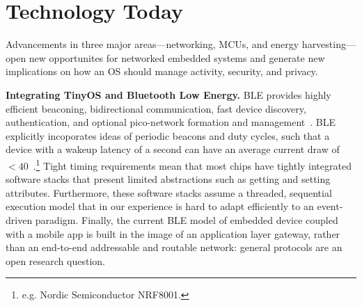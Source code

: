 \section{Technology Today}
Advancements in three major areas---networking, MCUs, and energy
harvesting---open new opportunites for networked embedded systems and generate
new implications on how an OS should manage activity, security, and privacy.


\smallskip\noindent
\textbf{Integrating TinyOS and Bluetooth Low Energy.}
BLE provides highly efficient beaconing,
bidirectional communication, fast device discovery, authentication, and
optional pico-network formation and management~\cite{ble-overview}.
BLE explicitly incoporates ideas of periodic beacons and duty cycles,
such that a device with a wakeup latency of a second can have
an average current draw of $< 40$~\uA.\footnote{
  e.g. Nordic Semiconductor NRF8001.
}
%
Tight timing requirements mean that most chips have tightly
integrated software stacks that present limited abstractions such as
getting and setting attributes. Furthermore, these software stacks
assume a threaded, sequential execution model that in our experience
is hard to adapt efficiently to an event-driven paradigm. 
%
Finally, the current BLE model of embedded device coupled with a
mobile app is built in the image of an application layer gateway,
rather than an end-to-end addressable and routable network:
general protocols are an open research question.




